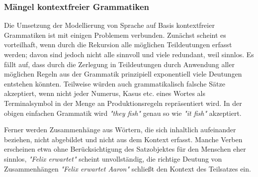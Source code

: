 \documentclass[12pt]{paper}
\begin{document}
\begin{table}
\end{table}

\subsubsection{Mängel kontextfreier Grammatiken}
Die Umsetzung der Modellierung von Sprache auf Basis kontextfreier Grammatiken ist mit einigen Problemem verbunden. Zunächst scheint es vorteilhaft, wenn durch die Rekursion alle möglichen Teildeutungen erfasst werden; davon sind jedoch nicht alle sinnvoll und viele redundant, weil sinnlos. Es fällt auf, dass durch die Zerlegung in Teildeutungen durch Anwendung aller möglichen Regeln aus der Grammatik prinzipiell exponentiell viele Deutungen entstehen könnten. Teilweise würden auch grammatikalisch falsche Sätze akzeptiert, wenn nicht jeder Numerus, Kasus etc. eines Wortes als Terminalsymbol in der Menge an Produktionsregeln repräsentiert wird. In der obigen einfachen Grammatik wird \textit{"they fish"} genau so wie \textit{"it fish"} akzeptiert. 

Ferner werden Zusammenhänge aus Wörtern, die sich inhaltlich aufeinander beziehen, nicht abgebildet und nicht aus dem Kontext erfasst. Manche Verben erscheinen etwa ohne Berücksichtigung des Satzobjektes für den Menschen eher sinnlos, \textit{"Felix erwartet"} scheint unvollständig, die richtige Deutung von Zusammenhängen \textit{"Felix erwartet Aaron"} schließt den Kontext des Teilsatzes ein.
\end{document}
